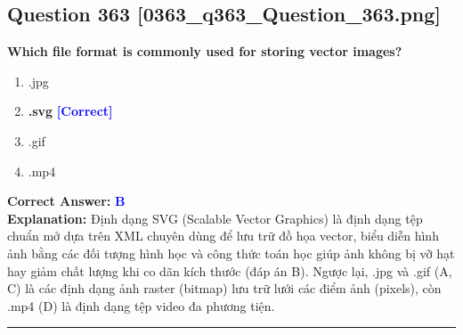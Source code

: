 \documentclass[11pt,a4paper]{article}
\begin{document}
\begin{minipage}{\textwidth}
\subsection*{Question 363 \quad \footnotesize{[0363\_q363\_Question\_363.png]}}
\noindent \textbf{Which file format is commonly used for storing vector images?}

\begin{enumerate}[label=\Alph*.]
    \item .jpg
    \item \textbf{.svg} \hfill \textcolor{blue}{\textbf{[Correct]}}
    \item .gif
    \item .mp4
\end{enumerate}

\noindent \textbf{Correct Answer:} \textcolor{blue}{\textbf{B}} \\[2pt]
\noindent \textbf{Explanation:} Định dạng SVG (Scalable Vector Graphics) là định dạng tệp chuẩn mở dựa trên XML chuyên dùng để lưu trữ đồ họa vector, biểu diễn hình ảnh bằng các đối tượng hình học và công thức toán học giúp ảnh không bị vỡ hạt hay giảm chất lượng khi co dãn kích thước (đáp án B). Ngược lại, .jpg và .gif (A, C) là các định dạng ảnh raster (bitmap) lưu trữ lưới các điểm ảnh (pixels), còn .mp4 (D) là định dạng tệp video đa phương tiện.

\par\vspace{0.3cm}
\hrule
\vspace{0.3cm}
\end{minipage}
\end{document}
